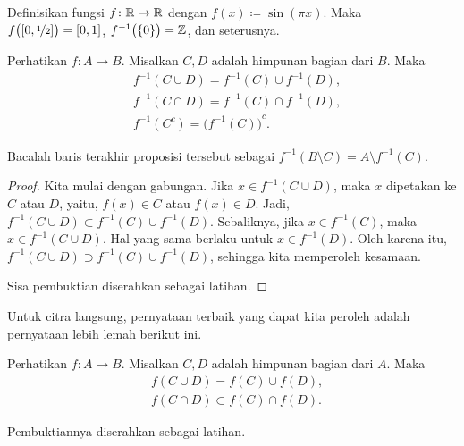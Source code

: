 \begin{example}
Definisikan fungsi $f \colon {\mathbb{R}} \to {\mathbb{R}}$ dengan
$f(x) \coloneqq \sin(\pi x)$.  Maka $f\bigl([0,\nicefrac{1}{2}]\bigr) = [0,1]$, 
$f^{-1}\bigl(\{0\}\bigr) = {\mathbb{Z}}$, dan seterusnya.
\end{example}

\begin{prop} \label{st:propinv}
Perhatikan $f \colon A \to B$.  Misalkan $C, D$ adalah himpunan bagian dari $B$.  Maka
\begin{align*}
& f^{-1}( C \cup D) = f^{-1} (C) \cup f^{-1} (D) , \\
& f^{-1}( C \cap D) = f^{-1} (C) \cap f^{-1} (D) , \\
& f^{-1}( C^c) = {\bigl( f^{-1} (C) \bigr)}^c .
\end{align*}
\end{prop}

Bacalah baris terakhir proposisi tersebut sebagai
$f^{-1}( B \setminus C) = A \setminus f^{-1} (C)$.

\begin{proof}
Kita mulai dengan gabungan.  Jika $x \in 
f^{-1}( C \cup D)$, maka
$x$ dipetakan ke $C$ atau $D$, yaitu, $f(x) \in C$ atau $f(x) \in D$.  Jadi,
$f^{-1}( C \cup D) \subset f^{-1} (C) \cup f^{-1} (D)$.  Sebaliknya,
jika $x \in f^{-1}(C)$, maka $x \in f^{-1}(C \cup D)$.  Hal yang sama berlaku untuk
$x \in f^{-1}(D)$.  Oleh karena itu,
$f^{-1}( C \cup D) \supset f^{-1} (C) \cup f^{-1} (D)$, sehingga kita memperoleh
kesamaan.

Sisa pembuktian diserahkan sebagai latihan.
\end{proof}

Untuk citra langsung, pernyataan terbaik yang dapat kita peroleh adalah
pernyataan lebih lemah berikut ini.

\begin{prop} \label{st:propfor}
Perhatikan $f \colon A \to B$.  Misalkan $C, D$ adalah himpunan bagian dari $A$.  Maka
\begin{align*}
& f( C \cup D) = f (C) \cup f (D) , \\
& f( C \cap D) \subset f (C) \cap f (D) .
\end{align*}
\end{prop}

Pembuktiannya diserahkan sebagai latihan.

